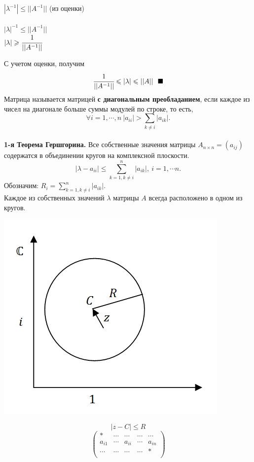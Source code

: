 \documentclass[12pt]{article}
\theoremstyle{definition}
\numberwithin{equation}{section}
\begin{document}
\begin{center}
$|\lambda^{-1}|\leqslant||A^{-1}||$ (из оценки)\\~\\
$|\lambda|^{-1}\leqslant ||A^{-1}||$\\
$|\lambda|\geqslant \cfrac{1}{||A^{-1}||}$
\end{center}
С учетом оценки, получим $$\cfrac{1}{||A^{-1}||}\leqslant|\lambda|\leqslant||A||~~\blacksquare$$ 
Матрица называется матрицей \textbf{с диагональным преобладанием}, если каждое из чисел на диагонале больше суммы модулей по строке, то есть, $$\forall i=1,\cdots,n~|a_{ii}|>\sum\limits_{k\neq i}|a_{ik}|.$$
~\\
\textbf{1-я Теорема Гершгорина.} Все собственные значения матрицы $A_{n \times n}=(a_{ij})$ содержатся в объединении кругов на комплексной плоскости. $$|\lambda-a_{ii}|\leqslant \sum\limits_{k=1, k\neq i}^n|a_{ik}|,~i=1,\cdots n.$$
Обозначим: $R_i=\sum\limits_{k=1, k\neq i}^n|a_{ik}|.$\\
Каждое из собственных значений $\lambda$ матрицы $A$ всегда расположено в одном из кругов.
\begin{center}
\includegraphics[scale=0.8]{l9_2.png}
\end{center}
$$|z-C|\leqslant R$$
\[\begin{pmatrix}
* & \cdots & \cdots & \cdots & \cdots\\
a_{i1} & \cdots & a_{ii} & \cdots & a_{in}\\
\cdots & \cdots & \cdots & \cdots & *\\
\end{pmatrix}\]
\end{document}
